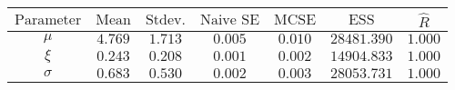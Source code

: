 \begin{tabular}{ccccccc}
\toprule
$\textrm{Parameter}$ & $\textrm{Mean}$ & $\textrm{Stdev.}$ & $\textrm{Naive SE}$ & $\textrm{MCSE}$ & $\textrm{ESS}$ & $\hat{R}$\\
\midrule
$\mu$ & $4.769$ & $1.713$ & $0.005$ & $0.010$ & $28481.390$ & $1.000$\\
$\xi$ & $0.243$ & $0.208$ & $0.001$ & $0.002$ & $14904.833$ & $1.000$\\
$\sigma$ & $0.683$ & $0.530$ & $0.002$ & $0.003$ & $28053.731$ & $1.000$\\
\bottomrule
\end{tabular}
